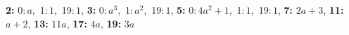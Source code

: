 \textsf{\bfseries 2:} 0:\,$a$,\ 1:\,$1$,\ 19:\,$1$, \textsf{\bfseries 3:} 0:\,$a^3$,\ 1:\,$a^2$,\ 19:\,$1$, \textsf{\bfseries 5:} 0:\,$4a^2 + 1$,\ 1:\,$1$,\ 19:\,$1$, \textsf{\bfseries 7:} $2a + 3$, \textsf{\bfseries 11:} $a + 2$, \textsf{\bfseries 13:} $11a$, \textsf{\bfseries 17:} $4a$, \textsf{\bfseries 19:} $3a$